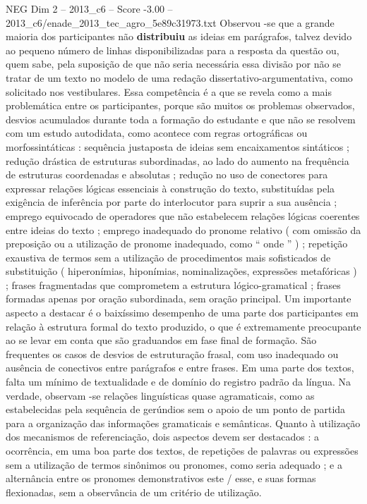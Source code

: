 \begin{textsample}{NEG Dim 2 – 2013\_c6 – Score -3.00 – 2013\_c6/enade\_2013\_tec\_agro\_5e89c31973.txt}
Observou -se que a grande maioria dos participantes não \textbf{distribuiu} as ideias em parágrafos, talvez devido ao pequeno número de linhas disponibilizadas para a resposta da questão ou, quem sabe, pela suposição de que não seria necessária essa divisão por não se tratar de um texto no modelo de uma redação dissertativo-argumentativa, como solicitado nos vestibulares.
Essa competência é a que se revela como a mais problemática entre os participantes, porque são muitos os problemas observados, desvios acumulados durante toda a formação do estudante e que não se resolvem com um estudo autodidata, como acontece com regras ortográficas ou morfossintáticas : sequência justaposta de ideias sem encaixamentos sintáticos ; redução drástica de estruturas subordinadas, ao lado do aumento na frequência de estruturas coordenadas e absolutas ; redução no uso de conectores para expressar relações lógicas essenciais à construção do texto, substituídas pela exigência de inferência por parte do interlocutor para suprir a sua ausência ; emprego equivocado de operadores que não estabelecem relações lógicas coerentes entre ideias do texto ; emprego inadequado do pronome relativo ( com omissão da preposição ou a utilização de pronome inadequado, como “ onde ” ) ; repetição exaustiva de termos sem a utilização de procedimentos mais sofisticados de substituição ( hiperonímias, hiponímias, nominalizações, expressões metafóricas ) ; frases fragmentadas que comprometem a estrutura lógico-gramatical ; frases formadas apenas por oração subordinada, sem oração principal.
Um importante aspecto a destacar é o baixíssimo desempenho de uma parte dos participantes em relação à estrutura formal do texto produzido, o que é extremamente preocupante ao se levar em conta que são graduandos em fase final de formação.
São frequentes os casos de desvios de estruturação frasal, com uso inadequado ou ausência de conectivos entre parágrafos e entre frases.
Em uma parte dos textos, falta um mínimo de textualidade e de domínio do registro padrão da língua.
Na verdade, observam -se relações linguísticas quase agramaticais, como as estabelecidas pela sequência de gerúndios sem o apoio de um ponto de partida para a organização das informações gramaticais e semânticas.
Quanto à utilização dos mecanismos de referenciação, dois aspectos devem ser destacados : a ocorrência, em uma boa parte dos textos, de repetições de palavras ou expressões sem a utilização de termos sinônimos ou pronomes, como seria adequado ; e a alternância entre os pronomes demonstrativos este / esse, e suas formas flexionadas, sem a observância de um critério de utilização.

\end{textsample}
